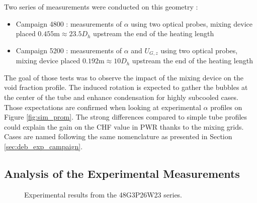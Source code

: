 Two series of measurements were conducted on this geometry : 

\begin{itemize}
\item Campaign 4800 : measurements of $\alpha$ using two optical probes, mixing device placed $0.455\text{m}\approx 23.5D_{h}$ upstream the end of the heating length
\item Campaign 5200 : measurements of $\alpha$ and $U_{G,z}$ using two optical probes, mixing device placed $0.192\text{m}\approx 10D_{h}$ upstream the end of the heating length
\end{itemize}

The goal of those tests was to observe the impact of the mixing device on the void fraction profile. The induced rotation is expected to gather the bubbles at the center of the tube and enhance condensation for highly subcooled cases. Those expectations are confirmed when looking at experimental $\alpha$ profiles on Figure \ref{fig:sim_prom}. The strong differences compared to simple tube profiles could explain the gain on the CHF value in PWR thanks to the mixing grids. Cases are named following the same nomenclature as presented in Section \ref{sec:deb_exp_campaign}.

\subsection{Analysis of the Experimental Measurements}



\begin{figure}[!h]
\centering
{}

\caption{Experimental results from the 48G3P26W23 series.}
\label{fig:exp_48G3P26W23}
\end{figure}


